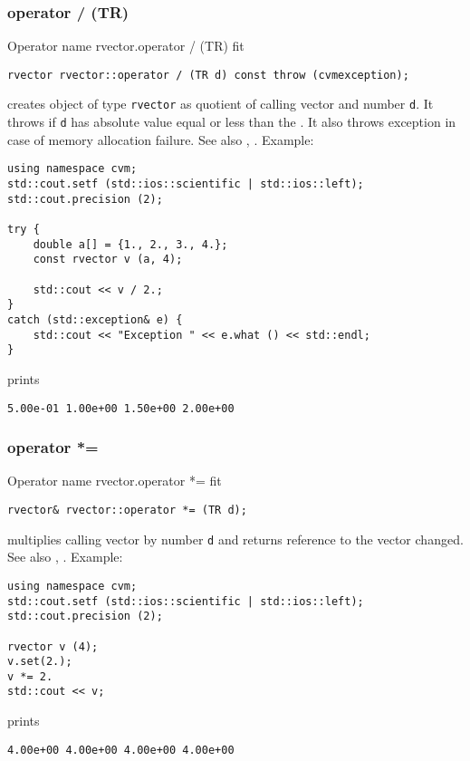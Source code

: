 \subsubsection{operator / (TR)}
Operator%
\pdfdest name {rvector.operator / (TR)} fit
\begin{verbatim}
rvector rvector::operator / (TR d) const throw (cvmexception);
\end{verbatim}
creates  object of type \verb"rvector" as  quotient of
calling vector and number \verb"d". It throws
if \verb"d" has  absolute value equal or less
than the 
.
It also throws exception
in case of memory allocation failure.
See also ,
.
Example:
\begin{Verbatim}
using namespace cvm;
std::cout.setf (std::ios::scientific | std::ios::left); 
std::cout.precision (2);

try {
    double a[] = {1., 2., 3., 4.};
    const rvector v (a, 4);

    std::cout << v / 2.;
}
catch (std::exception& e) {
    std::cout << "Exception " << e.what () << std::endl;
}
\end{Verbatim}
prints
\begin{Verbatim}
5.00e-01 1.00e+00 1.50e+00 2.00e+00
\end{Verbatim}
\newpage


\subsubsection{operator *=}
Operator%
\pdfdest name {rvector.operator *=} fit
\begin{verbatim}
rvector& rvector::operator *= (TR d);
\end{verbatim}
multiplies calling vector by number \verb"d"
and returns  reference to
the vector changed.
See also ,
.
Example:
\begin{Verbatim}
using namespace cvm;
std::cout.setf (std::ios::scientific | std::ios::left); 
std::cout.precision (2);

rvector v (4);
v.set(2.);
v *= 2.
std::cout << v;
\end{Verbatim}
prints
\begin{Verbatim}
4.00e+00 4.00e+00 4.00e+00 4.00e+00
\end{Verbatim}
\newpage


